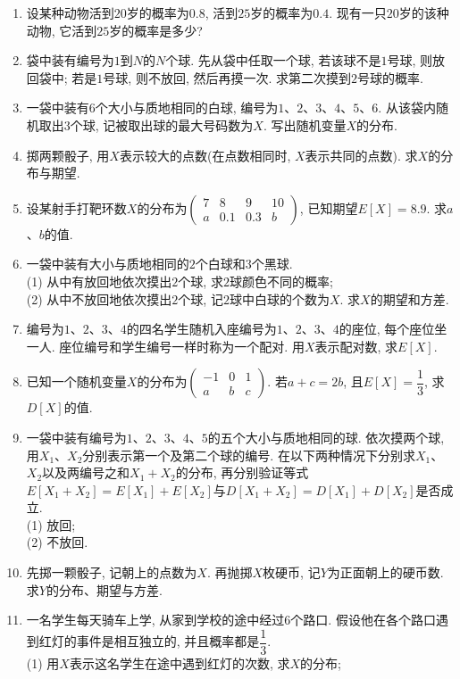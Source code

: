 \documentclass[10pt,a4paper]{article}
\begin{document}
\begin{enumerate}[1.]
\item 设某种动物活到$20$岁的概率为$0.8$, 活到$25$岁的概率为$0.4$. 现有一只$20$岁的该种动物, 它活到$25$岁的概率是多少? 
\item 袋中装有编号为$1$到$N$的$N$个球. 先从袋中任取一个球, 若该球不是$1$号球, 则放回袋中; 若是$1$号球, 则不放回, 然后再摸一次. 求第二次摸到$2$号球的概率.
\item 一袋中装有$6$个大小与质地相同的白球, 编号为$1$、$2$、$3$、$4$、$5$、$6$. 从该袋内随机取出$3$个球, 记被取出球的最大号码数为$X$. 写出随机变量$X$的分布.
\item 掷两颗骰子, 用$X$表示较大的点数(在点数相同时, $X$表示共同的点数). 求$X$的分布与期望.
\item 设某射手打靶环数$X$的分布为$\begin{pmatrix} 7 & 8 & 9 & 10 \\ a & 0.1 & 0.3 & b \end{pmatrix}$, 已知期望$E[X]=8.9$. 求$a$、$b$的值.
\item 一袋中装有大小与质地相同的$2$个白球和$3$个黑球.\\
(1) 从中有放回地依次摸出$2$个球, 求$2$球颜色不同的概率;\\
(2) 从中不放回地依次摸出$2$个球, 记$2$球中白球的个数为$X$. 求$X$的期望和方差.
\item 编号为$1$、$2$、$3$、$4$的四名学生随机入座编号为$1$、$2$、$3$、$4$的座位, 每个座位坐一人. 座位编号和学生编号一样时称为一个配对. 用$X$表示配对数, 求$E[X]$.
\item 已知一个随机变量$X$的分布为$\begin{pmatrix}-1 & 0 & 1 \\ a & b & c \end{pmatrix}$. 若$a+c=2b$, 且$E[X]=\dfrac 13$, 求$D[X]$的值.
\item 一袋中装有编号为$1$、$2$、$3$、$4$、$5$的五个大小与质地相同的球. 依次摸两个球, 用$X_1$、$X_2$分别表示第一个及第二个球的编号. 在以下两种情况下分别求$X_1$、$X_2$以及两编号之和$X_1+X_2$的分布, 再分别验证等式$E[X_1+X_2]=E[X_1]+E[X_2]$与$D[X_1+X_2]=D[X_1]+D[X_2]$是否成立.\\
(1) 放回;\\
(2) 不放回.
\item 先掷一颗骰子, 记朝上的点数为$X$. 再抛掷$X$枚硬币, 记$Y$为正面朝上的硬币数. 求$Y$的分布、期望与方差.
\item 一名学生每天骑车上学, 从家到学校的途中经过$6$个路口. 假设他在各个路口遇到红灯的事件是相互独立的, 并且概率都是$\dfrac 13$.\\
(1) 用$X$表示这名学生在途中遇到红灯的次数, 求$X$的分布;\\

\end{enumerate}
\end{document}
